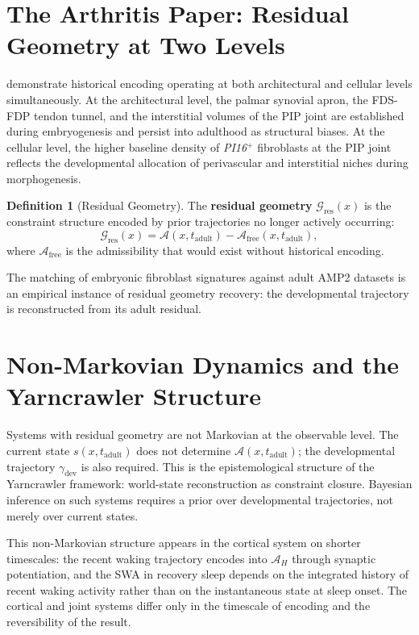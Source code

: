 \documentclass[12pt, a4paper, twoside]{book}
\theoremstyle{definition}
\newtheorem{definition}{Definition}[chapter]
\theoremstyle{remark}
\newcommand{\Adm}{\mathcal{A}}
\newcommand{\term}[1]{\textbf{#1}}
\newcommand{\gene}[1]{\textit{#1}}
\begin{document}
\section{The Arthritis Paper: Residual Geometry at Two Levels}

\citet{davidson2026} demonstrate historical encoding operating at both architectural and cellular levels simultaneously. At the architectural level, the palmar synovial apron, the FDS-FDP tendon tunnel, and the interstitial volumes of the PIP joint are established during embryogenesis and persist into adulthood as structural biases. At the cellular level, the higher baseline density of \gene{PI16}$^+$ fibroblasts at the PIP joint reflects the developmental allocation of perivascular and interstitial niches during morphogenesis.

\begin{definition}[Residual Geometry]
\label{def:residual}
The \term{residual geometry} $\mathcal{G}_{\mathrm{res}}(x)$ is the constraint structure encoded by prior trajectories no longer actively occurring:
\begin{equation}
  \mathcal{G}_{\mathrm{res}}(x) = \Adm(x, t_{\mathrm{adult}}) - \Adm_{\mathrm{free}}(x, t_{\mathrm{adult}}),
\end{equation}
where $\Adm_{\mathrm{free}}$ is the admissibility that would exist without historical encoding.
\end{definition}

The matching of embryonic fibroblast signatures against adult AMP2 datasets \citep{davidson2026, zhang2019} is an empirical instance of residual geometry recovery: the developmental trajectory is reconstructed from its adult residual.

\section{Non-Markovian Dynamics and the Yarncrawler Structure}

Systems with residual geometry are not Markovian at the observable level. The current state $s(x, t_{\mathrm{adult}})$ does not determine $\Adm(x, t_{\mathrm{adult}})$; the developmental trajectory $\gamma_{\mathrm{dev}}$ is also required. This is the epistemological structure of the Yarncrawler framework: world-state reconstruction as constraint closure. Bayesian inference on such systems requires a prior over developmental trajectories, not merely over current states.

This non-Markovian structure appears in the cortical system on shorter timescales: the recent waking trajectory encodes into $\Adm_H$ through synaptic potentiation, and the SWA in recovery sleep depends on the integrated history of recent waking activity \citep{vyazovskiy2009, tononi2014} rather than on the instantaneous state at sleep onset. The cortical and joint systems differ only in the timescale of encoding and the reversibility of the result.
\end{document}
